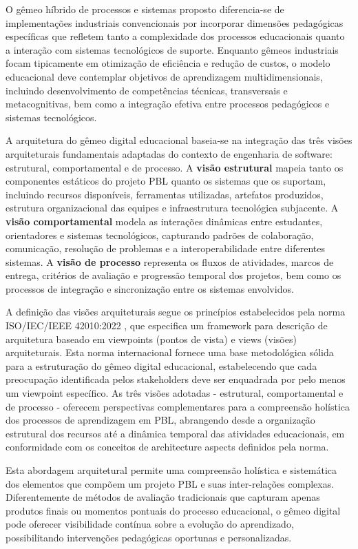 \documentclass[12pt,a4paper]{article}
\begin{document}
O gêmeo híbrido de processos e sistemas proposto diferencia-se de implementações industriais convencionais por incorporar dimensões pedagógicas específicas que refletem tanto a complexidade dos processos educacionais quanto a interação com sistemas tecnológicos de suporte. Enquanto gêmeos industriais focam tipicamente em otimização de eficiência e redução de custos, o modelo educacional deve contemplar objetivos de aprendizagem multidimensionais, incluindo desenvolvimento de competências técnicas, transversais e metacognitivas, bem como a integração efetiva entre processos pedagógicos e sistemas tecnológicos.

A arquitetura do gêmeo digital educacional baseia-se na integração das três visões arquiteturais fundamentais adaptadas do contexto de engenharia de software: estrutural, comportamental e de processo. A \textbf{visão estrutural} mapeia tanto os componentes estáticos do projeto PBL quanto os sistemas que os suportam, incluindo recursos disponíveis, ferramentas utilizadas, artefatos produzidos, estrutura organizacional das equipes e infraestrutura tecnológica subjacente. A \textbf{visão comportamental} modela as interações dinâmicas entre estudantes, orientadores e sistemas tecnológicos, capturando padrões de colaboração, comunicação, resolução de problemas e a interoperabilidade entre diferentes sistemas. A \textbf{visão de processo} representa os fluxos de atividades, marcos de entrega, critérios de avaliação e progressão temporal dos projetos, bem como os processos de integração e sincronização entre os sistemas envolvidos.

A definição das visões arquiteturais segue os princípios estabelecidos pela norma ISO/IEC/IEEE 42010:2022 \cite{iso42010}, que especifica um framework para descrição de arquitetura baseado em viewpoints (pontos de vista) e views (visões) arquiteturais. Esta norma internacional fornece uma base metodológica sólida para a estruturação do gêmeo digital educacional, estabelecendo que cada preocupação identificada pelos stakeholders deve ser enquadrada por pelo menos um viewpoint específico. As três visões adotadas - estrutural, comportamental e de processo - oferecem perspectivas complementares para a compreensão holística dos processos de aprendizagem em PBL, abrangendo desde a organização estrutural dos recursos até a dinâmica temporal das atividades educacionais, em conformidade com os conceitos de architecture aspects definidos pela norma.

Esta abordagem arquitetural permite uma compreensão holística e sistemática dos elementos que compõem um projeto PBL e suas inter-relações complexas. Diferentemente de métodos de avaliação tradicionais que capturam apenas produtos finais ou momentos pontuais do processo educacional, o gêmeo digital pode oferecer visibilidade contínua sobre a evolução do aprendizado, possibilitando intervenções pedagógicas oportunas e personalizadas.
\end{document}
